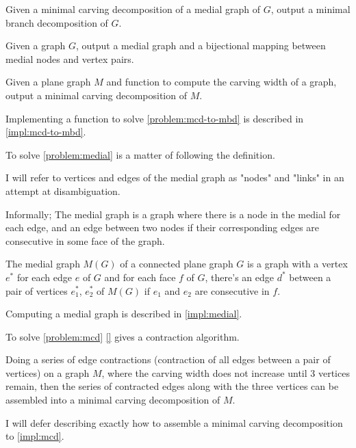 \documentclass{article}
\begin{document}
	\begin{problem}\label{problem:mcd-to-mbd}
		Given a minimal carving decomposition of a medial graph of $G$, output a minimal branch decomposition of $G$.
	\end{problem}

	\begin{problem}\label{problem:medial}
		Given a graph $G$, output a medial graph and a bijectional mapping between medial nodes and vertex pairs.
	\end{problem}

	\begin{problem}\label{problem:mcd}
		Given a plane graph $M$ and function to compute the carving width of a graph, output a minimal carving decomposition of $M$.
	\end{problem}

	Implementing a function to solve \ref{problem:mcd-to-mbd} is described in \ref{impl:mcd-to-mbd}.

	To solve \ref{problem:medial} is a matter of following the definition.

	I will refer to vertices and edges of the medial graph as "nodes" and "links" in an attempt at disambiguation. 

	Informally; The medial graph is a graph where there is a node in the medial for each edge, and an edge between two nodes if their corresponding edges are consecutive in some face of the graph.

	\begin{definition}
		The medial graph $M(G)$ of a connected plane graph $G$ is a graph with a vertex $e^*$ for each edge $e$ of $G$ and for each face $f$ of $G$, there's an edge $d^*$ between a pair of vertices $e_1^*$, $e_2^*$ of $M(G)$ if $e_1$ and $e_2$ are consecutive in $f$.
	\end{definition}

	Computing a medial graph is described in \ref{impl:medial}.

	To solve \ref{problem:mcd} \ref{} gives a contraction algorithm.

	Doing a series of edge contractions (contraction of all edges between a pair of vertices) on a graph $M$, where the carving width does not increase until 3 vertices remain, then the series of contracted edges along with the three vertices can be assembled into a minimal carving decomposition of $M$.
	
	I will defer describing exactly how to assemble a minimal carving decomposition to \ref{impl:mcd}.
\end{document}
